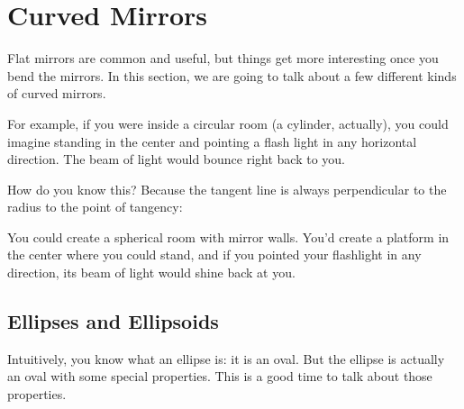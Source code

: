 \section{Curved Mirrors}

Flat mirrors are common and useful, but things get more interesting
once you bend the mirrors. In this section, we are going to talk about
a few different kinds of curved mirrors.

For example, if you were inside a circular room (a cylinder,
actually), you could imagine standing in the center and pointing a
flash light in any horizontal direction.  The beam of light would
bounce right back to you.


How do you know this?  Because the tangent line is always perpendicular to the radius to the point of tangency:


You could create a spherical room with mirror walls. You'd
create a platform in the center where you could stand, and if you
pointed your flashlight in any direction, its beam of light would
shine back at you.

\subsection{Ellipses and Ellipsoids}

Intuitively, you know what an ellipse is: it is an oval. But the
ellipse is actually an oval with some special properties.  This is a
good time to talk about those properties.

